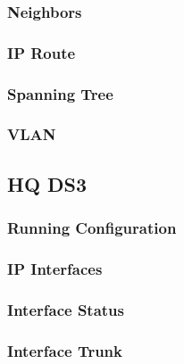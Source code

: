 \subsubsection{Neighbors}


\subsubsection{IP Route}


\subsubsection{Spanning Tree}


\subsubsection{VLAN}






\subsection{HQ DS3}
\subsubsection{Running Configuration}


\subsubsection{IP Interfaces}


\subsubsection{Interface Status}


\subsubsection{Interface Trunk}


